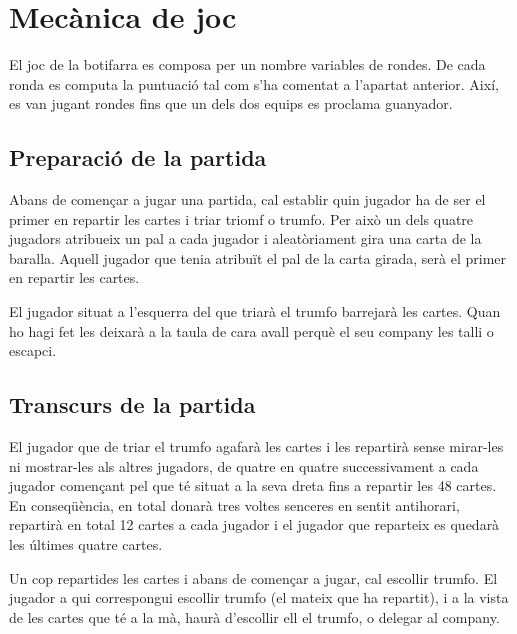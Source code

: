 \section{Mecànica de joc}

El joc de la botifarra es composa per un nombre variables de rondes. De cada ronda es computa la puntuació tal com s'ha comentat a l'apartat anterior. Així, es van jugant rondes fins que un dels dos equips es proclama guanyador.

\subsection{Preparació de la partida}

Abans de començar a jugar una partida, cal establir quin jugador ha de ser el primer en repartir les cartes i triar triomf o trumfo. Per això un dels quatre jugadors atribueix un pal a cada jugador i aleatòriament gira una carta de la baralla. Aquell jugador que tenia atribuït el pal de la carta girada, serà el primer en repartir les cartes.

El jugador situat a l'esquerra del que triarà el trumfo barrejarà les cartes. Quan ho hagi fet les deixarà a la taula de cara avall perquè el seu company les talli o escapci.

\subsection{Transcurs de la partida}

El jugador que de triar el trumfo agafarà les cartes i les repartirà sense mirar-les ni mostrar-les als altres jugadors, de quatre en quatre successivament a cada jugador començant pel que té situat a la seva dreta fins a repartir les 48 cartes. En conseqüència, en total donarà tres voltes senceres en sentit antihorari, repartirà en total 12 cartes a cada jugador i el jugador que reparteix es quedarà les últimes quatre cartes.

Un cop repartides les cartes i abans de començar a jugar, cal escollir trumfo. El jugador a qui correspongui escollir trumfo (el mateix que ha repartit), i a la vista de les cartes que té a la mà, haurà d'escollir ell el trumfo, o delegar al company.

